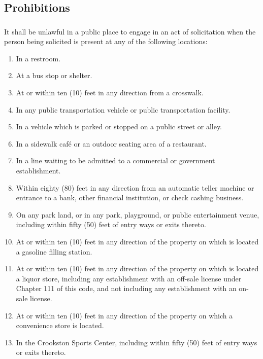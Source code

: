 \subsection{Prohibitions}
\subsubsection{}
It shall be unlawful in a public place to engage in an act of solicitation when the person being solicited is present at any of the following locations:
\begin{enumerate}[{\indent}a)]
    \item In a restroom.
    \item At a bus stop or shelter.
    \item At or within ten (10) feet in any direction from a crosswalk.
    \item In any public transportation vehicle or public transportation facility.
    \item In a vehicle which is parked or stopped on a public street or alley.
    \item In a sidewalk café or an outdoor seating area of a restaurant.
    \item In a line waiting to be admitted to a commercial or government establishment.
    \item Within eighty (80) feet in any direction from an automatic teller machine or entrance to a bank, other financial institution, or check cashing business.
    \item On any park land, or in any park, playground, or public entertainment venue, including within fifty (50) feet of entry ways or exits thereto.
    \item At or within ten (10) feet in any direction of the property on which is located a gasoline filling station.
    \item At or within ten (10) feet in any direction of the property on which is located a liquor store, including any establishment with an off-sale license under Chapter 111 of this code, and not including any establishment with an on-sale license.
    \item At or within ten (10) feet in any direction of the property on which a convenience store is located.
    \item In the Crookston Sports Center, including within fifty (50) feet of entry ways or exits thereto.
\end{enumerate}
